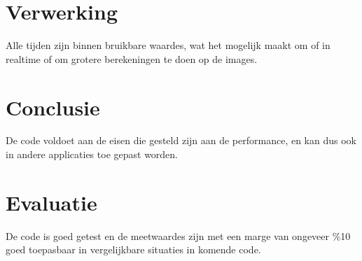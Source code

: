\documentclass[11pt]{article}
\begin{document}
    \section{Verwerking}\label{sec:verwerking}
    Alle tijden zijn binnen bruikbare waardes, wat het mogelijk maakt om of in realtime of om
    grotere berekeningen te doen op de images.


    \section{Conclusie}\label{sec:conclusie}
    De code voldoet aan de eisen die gesteld zijn aan de performance, en kan dus ook in andere
    applicaties toe gepast worden.


    \section{Evaluatie}\label{sec:evaluatie}
    De code is goed getest en de meetwaardes zijn met een marge van ongeveer \%10 goed toepasbaar
    in vergelijkbare situaties in komende code.
\end{document}
